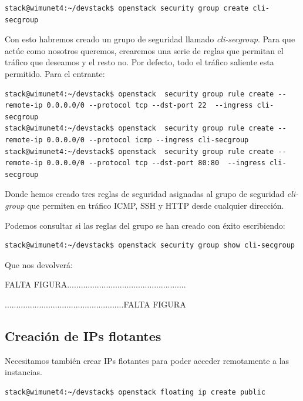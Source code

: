 \begin{lstlisting}[style=Consola]
stack@wimunet4:~/devstack$ openstack security group create cli-secgroup
\end{lstlisting}

Con esto habremos creado un grupo de seguridad llamado \textit{cli-secgroup}. Para que actúe como nosotros queremos, crearemos una serie de reglas que permitan el tráfico que deseamos y el resto no. Por defecto, todo el tráfico saliente esta permitido. Para el entrante:

\begin{lstlisting}[style=Consola]
stack@wimunet4:~/devstack$ openstack  security group rule create --remote-ip 0.0.0.0/0 --protocol tcp --dst-port 22  --ingress cli-secgroup
stack@wimunet4:~/devstack$ openstack  security group rule create --remote-ip 0.0.0.0/0 --protocol icmp --ingress cli-secgroup
stack@wimunet4:~/devstack$ openstack  security group rule create --remote-ip 0.0.0.0/0 --protocol tcp --dst-port 80:80  --ingress cli-secgroup
\end{lstlisting}

Donde hemos creado tres reglas de seguridad asignadas al grupo de seguridad \textit{cli-group} que permiten en tráfico ICMP, SSH y HTTP desde cualquier dirección.

Podemos consultar si las reglas del grupo se han creado con éxito escribiendo:

\begin{lstlisting}[style=Consola]
stack@wimunet4:~/devstack$ openstack security group show cli-secgroup
\end{lstlisting}

Que nos devolverá:

\begin{tcolorbox}[colback=green!5!white,colframe=green!75!black]
FALTA FIGURA....................................................

....................................................FALTA FIGURA
\end{tcolorbox}




\subsection{Creación de IPs flotantes}
Necesitamos también crear IPs flotantes para poder acceder remotamente a las instancias.

\begin{lstlisting}[style=Consola]
stack@wimunet4:~/devstack$ openstack floating ip create public
\end{lstlisting}

